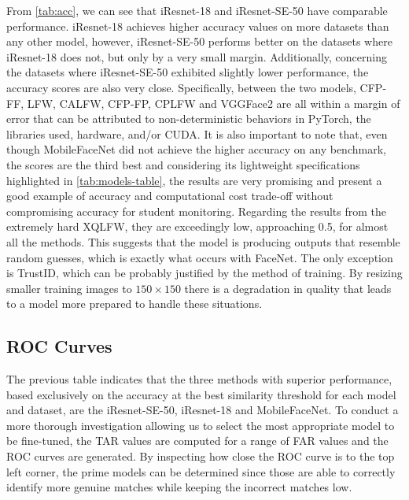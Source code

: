 \documentclass[class=report, crop=false, a4paper, 12pt]{standalone}
\begin{document}
\par From \autoref{tab:acc}, we can see that iResnet-18 and iResnet-SE-50 have comparable performance. iResnet-18 achieves higher accuracy values on more datasets than any other model, however, iResnet-SE-50 performs better on the datasets where iResnet-18 does not, but only by a very small margin. Additionally, concerning the datasets where iResnet-SE-50 exhibited slightly lower performance, the accuracy scores are also very close. Specifically, between the two models, CFP-FF, LFW, CALFW, CFP-FP, CPLFW and VGGFace2 are all within a margin of error that can be attributed to non-deterministic behaviors in PyTorch, the libraries used, hardware, and/or CUDA. It is also important to note that, even though MobileFaceNet did not achieve the higher accuracy on any benchmark, the scores are the third best and considering its lightweight specifications highlighted in \autoref{tab:models-table}, the results are very promising and present a good example of accuracy and computational cost trade-off without compromising accuracy for student monitoring. Regarding the results from the extremely hard XQLFW, they are exceedingly low, approaching 0.5, for almost all the methods. This suggests that the model is producing outputs that resemble random guesses, which is exactly what occurs with FaceNet. The only exception is TrustID, which can be probably justified by the method of training. By resizing smaller training images to $150\times150$ there is a degradation in quality that leads to a model more prepared to handle these situations. 


\subsection{ROC Curves}
\par The previous table indicates that the three methods with superior performance, based exclusively on the accuracy at the best similarity threshold for each model and dataset, are the iResnet-SE-50, iResnet-18 and MobileFaceNet. To conduct a more thorough investigation allowing us to select the most appropriate model to be fine-tuned, the TAR values are computed for a range of FAR values and the ROC curves are generated. By inspecting how close the ROC curve is to the top left corner, the prime models can be determined since those are able to correctly identify more genuine matches while keeping the incorrect matches low. 
\end{document}

